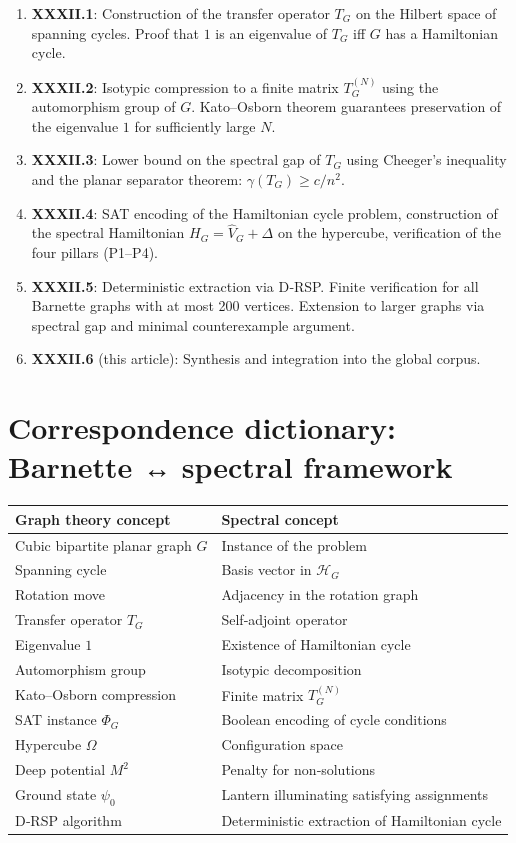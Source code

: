 \documentclass[11pt,a4paper]{article}
\begin{document}
\begin{enumerate}
\item \textbf{XXXII.1}: Construction of the transfer operator \(T_G\) on the Hilbert space of spanning cycles. Proof that \(1\) is an eigenvalue of \(T_G\) iff \(G\) has a Hamiltonian cycle.
\item \textbf{XXXII.2}: Isotypic compression to a finite matrix \(T_G^{(N)}\) using the automorphism group of \(G\). Kato–Osborn theorem guarantees preservation of the eigenvalue \(1\) for sufficiently large \(N\).
\item \textbf{XXXII.3}: Lower bound on the spectral gap of \(T_G\) using Cheeger's inequality and the planar separator theorem: \(\gamma(T_G) \ge c / n^2\).
\item \textbf{XXXII.4}: SAT encoding of the Hamiltonian cycle problem, construction of the spectral Hamiltonian \(H_G = \hat{V}_G + \Delta\) on the hypercube, verification of the four pillars (P1–P4).
\item \textbf{XXXII.5}: Deterministic extraction via D‑RSP. Finite verification for all Barnette graphs with at most 200 vertices. Extension to larger graphs via spectral gap and minimal counterexample argument.
\item \textbf{XXXII.6} (this article): Synthesis and integration into the global corpus.
\end{enumerate}

\section{Correspondence dictionary: Barnette ↔ spectral framework}

\begin{center}
\small
\begin{tabular}{@{}l|l@{}}
\toprule
\textbf{Graph theory concept} & \textbf{Spectral concept} \\
\midrule
Cubic bipartite planar graph \(G\) & Instance of the problem \\
Spanning cycle & Basis vector in \(\mathcal{H}_G\) \\
Rotation move & Adjacency in the rotation graph \\
Transfer operator \(T_G\) & Self‑adjoint operator \\
Eigenvalue \(1\) & Existence of Hamiltonian cycle \\
Automorphism group & Isotypic decomposition \\
Kato–Osborn compression & Finite matrix \(T_G^{(N)}\) \\
SAT instance \(\Phi_G\) & Boolean encoding of cycle conditions \\
Hypercube \(\Omega\) & Configuration space \\
Deep potential \(M^2\) & Penalty for non‑solutions \\
Ground state \(\psi_0\) & Lantern illuminating satisfying assignments \\
D‑RSP algorithm & Deterministic extraction of Hamiltonian cycle \\
\bottomrule
\end{tabular}
\end{center}
\end{document}
